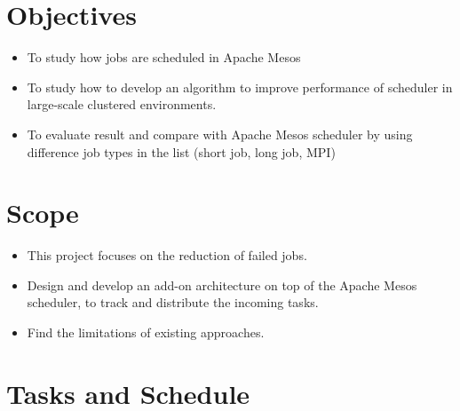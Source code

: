 \documentclass[12pt,oneside,openright,a4paper]{cpe-english-project}
\begin{document}
\section{Objectives}

\begin{itemize}
  \item  To study how jobs are scheduled in Apache Mesos
  \item  To study how to develop an algorithm to improve performance of scheduler in large-scale clustered environments.
  \item  To evaluate result and compare with Apache Mesos scheduler by using difference job types in the list (short job, long job, MPI)
\end{itemize}

\section{Scope}

\begin{itemize}
  \item  This project focuses on the reduction of failed jobs.
  \item  Design and develop an add-on architecture on top of the Apache Mesos scheduler, to track and distribute the incoming tasks.
  \item  Find the limitations of existing approaches.
\end{itemize}

\newpage

\section{Tasks and Schedule}
\end{document}
